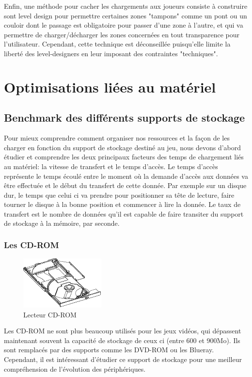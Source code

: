 \documentclass[a4paper, 11pt]{article} %
\begin{document}
Enfin, une méthode pour cacher les chargements aux joueurs consiste à construire sont level design pour permettre certaines zones "tampons" comme un pont ou un couloir dont le passage est obligatoire pour passer d'une zone à l'autre, et qui va permettre de charger/décharger les zones concernées en tout transparence pour l'utilisateur. Cependant, cette technique est déconseillée puisqu'elle limite la liberté des level-designers en leur imposant des contraintes "techniques".

\newpage
\section*{Optimisations liées au matériel}
\subsection*{Benchmark des différents supports de stockage}
Pour mieux comprendre comment organiser nos ressources et la façon de les charger en fonction du support de stockage destiné au jeu, nous devons d'abord étudier et comprendre les deux principaux facteurs des temps de chargement liés au matériel: la vitesse de transfert et le temps d'accès. Le temps d'accès représente le temps écoulé entre le moment où la demande d'accès aux données va être effectuée et le début du transfert de cette donnée. Par exemple sur un disque dur, le temps que celui ci va prendre pour positionner sa tête de lecture, faire tourner le disque à la bonne position et commencer à lire la donnée. Le taux de transfert est le nombre de données qu'il est capable de faire transiter du support de stockage à la mémoire, par seconde.

\subsubsection*{Les CD-ROM}
\begin{figure}
\begin{center}
\includegraphics[width=0.38\textwidth]{images/cdrom.png}
\end{center}
\caption{Lecteur CD-ROM}
\end{figure}
Les CD-ROM ne sont plus beaucoup utilisés pour les jeux vidéos, qui dépassent maintenant souvent la capacité de stockage de ceux ci (entre 600 et 900Mo). Ils sont remplacés par des supports comme les DVD-ROM ou les Blueray. Cependant, il est intéressant d'étudier ce support de stockage pour une meilleur compréhension de l'évolution des périphériques.
\end{document}
